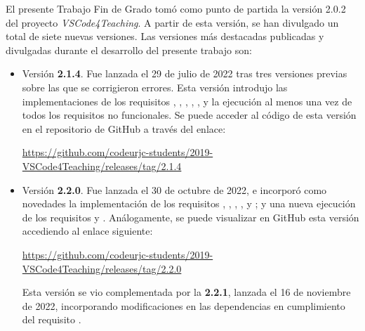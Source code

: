El presente Trabajo Fin de Grado tomó como punto de partida la versión 2.0.2 del proyecto \textit{VSCode4Teaching}. A partir de esta versión, se han divulgado un total de siete nuevas versiones. Las versiones más destacadas publicadas y divulgadas durante el desarrollo del presente trabajo son:
\begin{itemize}
    \item Versión \textbf{2.1.4}. Fue lanzada el 29 de julio de 2022 tras tres versiones previas sobre las que se corrigieron errores. Esta versión introdujo las implementaciones de los requisitos , , , , ,  y la ejecución al menos una vez de todos los requisitos no funcionales. Se puede acceder al código de esta versión en el repositorio de GitHub a través del enlace:
    \vspace{-0.25\baselineskip}
    \begin{center}
        \href{https://github.com/codeurjc-students/2019-VSCode4Teaching/releases/tag/2.1.4}{https://github.com/codeurjc-students/2019-VSCode4Teaching/releases/tag/2.1.4}
    \end{center}
    \vspace{-0.25\baselineskip}

    \item Versión \textbf{2.2.0}. Fue lanzada el 30 de octubre de 2022, e incorporó como novedades la implementación de los requisitos , , , ,  y ; y una nueva ejecución de los requisitos  y . Análogamente, se puede visualizar en GitHub esta versión accediendo al enlace siguiente:
    \vspace{-0.5\baselineskip}
    \begin{center}
        \href{https://github.com/codeurjc-students/2019-VSCode4Teaching/releases/tag/2.2.0}{https://github.com/codeurjc-students/2019-VSCode4Teaching/releases/tag/2.2.0}
    \end{center}
    \vspace{-0.5\baselineskip}

    Esta versión se vio complementada por la \textbf{2.2.1}, lanzada el 16 de noviembre de 2022, incorporando modificaciones en las dependencias en cumplimiento del requisito .
\end{itemize}

